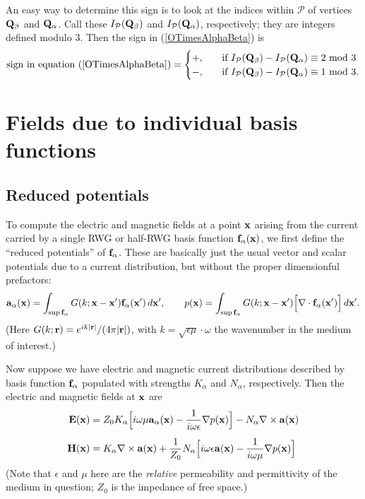 \documentclass[letterpaper]{article}
\begin{document}
An easy way to determine this sign is to look at the 
indices within $\mathcal{P}$ of vertices $\mathbf{Q}_\beta$
and $\mathbf{Q}_\alpha$. Call these $I_{\mathcal{P}}(\mathbf{Q}_\beta)$ and 
$I_{\mathcal{P}}(\mathbf{Q}_\alpha)$, respectively; they are integers
defined modulo 3. Then the sign in (\ref{OTimesAlphaBeta})
is 
$$ \text{sign in equation (\ref{OTimesAlphaBeta})} 
   = 
   \begin{cases}
   +, \quad &\text{if } I_{\mathcal{P}}(\mathbf{Q}_\beta)
                       -I_{\mathcal{P}}(\mathbf{Q}_\alpha)
                        \equiv 2 \text{ mod } 3 
   \\
   -, \quad &\text{if } I_{\mathcal{P}}(\mathbf{Q}_\beta)
                       -I_{\mathcal{P}}(\mathbf{Q}_\alpha)
                        \equiv 1 \text{ mod } 3.
   \end{cases}
$$

\newpage
\section{Fields due to individual basis functions}

\subsection*{Reduced potentials}

To compute the electric and magnetic fields at a point $\mathbf{x}$ 
arising from the current carried by a single RWG or
half-RWG basis function $\mathbf{f}_\alpha(\mathbf{x})$, we first define the
``reduced potentials'' of $\mathbf{f}_\alpha$. These are basically just 
the usual vector and scalar potentials due to a current 
distribution, but without the proper dimensionful prefactors:
$$ \mathbf{a}_\alpha(\mathbf{x}) =
   \int_{\sup \mathbf{f}_\alpha} 
     G(k; \mathbf{x} - \mathbf{x}^\prime) \mathbf{f}_\alpha(\mathbf{x}^\prime) \, d\mathbf{x}^\prime,
   \qquad
   p(\mathbf{x}) =
   \int_{\sup \mathbf{f}_\alpha} G(k; \mathbf{x} - \mathbf{x}^\prime) 
                     \Big[\nabla \cdot \mathbf{f}_\alpha(\mathbf{x}^\prime)\Big] \, d\mathbf{x}^\prime.
$$
(Here $G(k; \mathbf{r})=e^{ik|\mathbf{r}|}/{(4\pi|\mathbf{r}|)}$,
with $k=\sqrt{\epsilon\mu}\cdot \omega$ the wavenumber in the medium 
of interest.)

Now suppose we have electric and magnetic current distributions
described by basis function $\mathbf{f}_\alpha$ populated with strengths $K_\alpha$
and $N_\alpha$, respectively. Then the electric and magnetic fields at
$\mathbf{x}$ are 
\begin{align*}
 \mathbf{E} (\mathbf{x}) 
&= 
  Z_0 K_\alpha \Big[ i\omega \mu \mathbf{a}_\alpha(\mathbf{x}) 
                     - \frac{1}{i\omega \epsilon}\nabla p(\mathbf{x})
               \Big]
 - N_\alpha \nabla \times \mathbf{a}(\mathbf{x})
\\[5pt]
 \mathbf{H}(\mathbf{x}) 
&=
  K_\alpha \nabla \times \mathbf{a}(\mathbf{x})
 +\frac{1}{Z_0}
  N_\alpha \Big[   i\omega \epsilon \mathbf{a}(\mathbf{x}) 
                 - \frac{1}{i\omega \mu }\nabla p(\mathbf{x})
               \Big]
\end{align*}
(Note that $\epsilon$ and $\mu$ here are the \textit{relative}
permeability and permittivity of the medium in question; $Z_0$ 
is the impedance of free space.)
\end{document}
